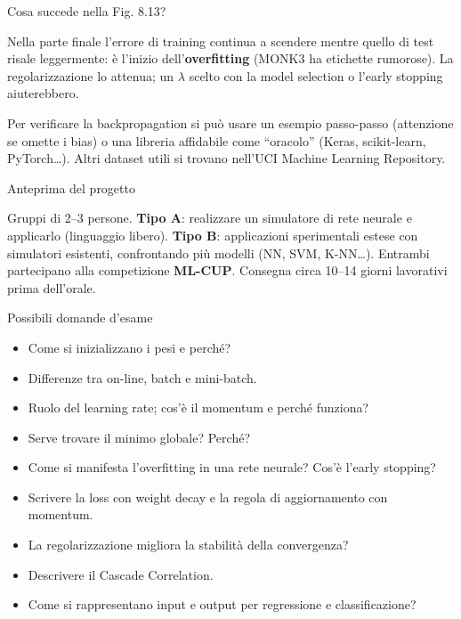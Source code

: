 \begin{boxquestion}{Cosa succede nella Fig. 8.13?}

Nella parte finale l'errore di training continua a scendere mentre
quello di test risale leggermente: è l'inizio dell'\textbf{overfitting}
(MONK3 ha etichette rumorose). La regolarizzazione lo attenua; un
\(\lambda\) scelto con la model selection o l'early stopping
aiuterebbero.

\end{boxquestion}

Per verificare la backpropagation si può usare un esempio passo-passo
(attenzione se omette i bias) o una libreria affidabile come ``oracolo''
(Keras, scikit-learn, PyTorch\ldots). Altri dataset utili si trovano
nell'UCI Machine Learning Repository.

\begin{boxnote}{Anteprima del progetto}

Gruppi di 2--3 persone. \textbf{Tipo A}: realizzare un simulatore di
rete neurale e applicarlo (linguaggio libero). \textbf{Tipo B}:
applicazioni sperimentali estese con simulatori esistenti, confrontando
più modelli (NN, SVM, K-NN\ldots). Entrambi partecipano alla
competizione \textbf{ML-CUP}. Consegna circa 10--14 giorni lavorativi
prima dell'orale.

\end{boxnote}

\begin{boxquestion}{Possibili domande d'esame}

\begin{itemize}
\tightlist
\item
  Come si inizializzano i pesi e perché?
\item
  Differenze tra on-line, batch e mini-batch.
\item
  Ruolo del learning rate; cos'è il momentum e perché funziona?
\item
  Serve trovare il minimo globale? Perché?
\item
  Come si manifesta l'overfitting in una rete neurale? Cos'è l'early
  stopping?
\item
  Scrivere la loss con weight decay e la regola di aggiornamento con
  momentum.
\item
  La regolarizzazione migliora la stabilità della convergenza?
\item
  Descrivere il Cascade Correlation.
\item
  Come si rappresentano input e output per regressione e
  classificazione?
\end{itemize}

\end{boxquestion}
